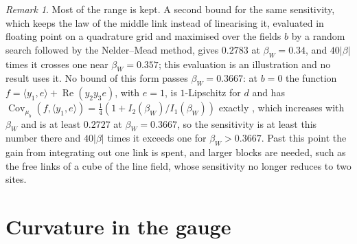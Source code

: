 \documentclass[aps,prd,twocolumn,superscriptaddress,nofootinbib,longbibliography,floatfix,amsmath,amssymb,10pt]{revtex4-2}
\theoremstyle{definition}
\theoremstyle{remark}
\newtheorem{remark}[theorem]{Remark}
\newcommand{\Cov}{\operatorname{Cov}}
\newcommand{\ip}[2]{\langle #1,#2\rangle}
\begin{document}
\begin{remark}\label{rem:blockgap}
Most of the range is kept. A second bound for the same sensitivity, which
keeps the law of the middle link instead of linearising it, evaluated in
floating point on a quadrature grid and maximised over the fields $b$ by a
random search followed by the Nelder--Mead method, gives $0.2783$ at
$\beta_W=0.34$, and $40|\beta|$ times it crosses one near $\beta_W=0.357$;
this evaluation is an illustration and no result uses it. No bound of this
form passes $\beta_W=0.3667$: at $b=0$ the function $f=\ip{y_1}e+
\operatorname{Re}(y_2y_3e)$, with $e=1$, is $1$-Lipschitz for $d$ and has $\Cov_{\mu_b}(f,
\ip{y_1}e)=\frac14(1+I_2(\beta_W)/I_1(\beta_W))$ exactly
\cite[Proposition~458]{BBLR26}, which increases with $\beta_W$ and is at least $0.2727$ at
$\beta_W=0.3667$, so the sensitivity is at least this number there and $40|\beta|$
times it exceeds one for $\beta_W>0.3667$. Past this point the gain from integrating out
one link is spent, and larger blocks are needed, such as the free links of a
cube of the line field, whose sensitivity no longer reduces to two sites.
\end{remark}

\section{Curvature in the gauge}\label{sec:curvature}
\end{document}
